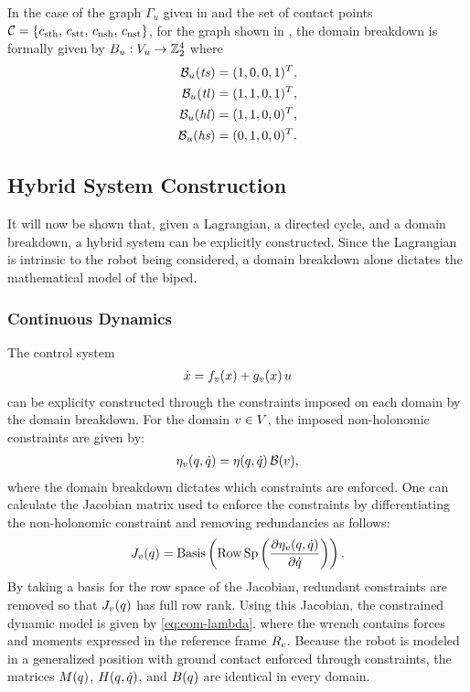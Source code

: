 \begin{exmp} \label{ex:domainbreakdown}
  In the case of the graph $\Gamma_{u}$ given in  and
  the set of contact points $\mathcal{C} =  \{c_{\mathrm{sth}}, \, c_{\mathrm{stt}}, \, c_{\mathrm{nsh}}, \, c_{\mathrm{nst}}\}$, for
  the graph shown in , the domain breakdown is formally
  given by  $B_{u} : V_{u} \to \mathbb{Z}_{2}^{4}$ where
  \begin{align}
    \nonumber
    \mathcal{B}_{u}(\mathit{ts}) &= (1, 0, 0, 1)^{T},\\
    \nonumber
    \mathcal{B}_{u}(\mathit{tl}) &= (1, 1, 0, 1)^{T},\\
    \nonumber
    \mathcal{B}_{u}(\mathit{hl}) &= (1, 1, 0, 0)^{T},\\
    \mathcal{B}_{u}(\mathit{hs}) &= (0, 1, 0, 0)^{T}.
    \label{eq:domainbreakdownvectors}
  \end{align}
\end{exmp}


\subsection{Hybrid System Construction}

It will now be shown that, given a Lagrangian, a directed cycle, and a domain
breakdown, a hybrid system can be explicitly constructed.
%
Since the Lagrangian is intrinsic to the robot being considered, a domain
breakdown alone dictates the mathematical model of the biped.


\subsubsection{Continuous Dynamics}

The control system
\begin{align*}
  {\dot {x}} = f_{v}(x) + g_{v}(x) \, u
\end{align*}
can be explicity constructed through the constraints imposed on each domain by
the domain breakdown.
%
For the domain $v \in V$, the imposed non-holonomic constraints are given by:
%
\begin{align*}
  \eta_{v}(q, \dot{q}) = \eta(q, \dot{q}) \, \mathcal{B}(v),
\end{align*}
%
where the domain breakdown dictates which constraints are enforced.
%
One can calculate the Jacobian matrix used to enforce the constraints by
differentiating the non-holonomic constraint and removing redundancies as follows:
%
\begin{align*}
  J_{v}(q) = \operatorname*{Basis}\left( \operatorname*{Row\,Sp}\left( \frac{\partial{\eta_{v}(q, \dot{q})}}{\partial{\dot{q}}} \right)
  \right).
\end{align*}
%
By taking a basis for the row space of the Jacobian, redundant constraints are
removed so that $J_{v}(q)$ has full row rank.
%
Using this Jacobian, the constrained dynamic model is given by
\eqref{eq:eom-lambda}.
where the wrench contains forces and moments expressed in the reference frame
$R_{c}$.
%
Because the robot is modeled in a generalized position with ground contact
enforced through constraints, the matrices $M(q)$, $H(q, \dot{q})$, and
$B(q)$ are identical in every domain.


